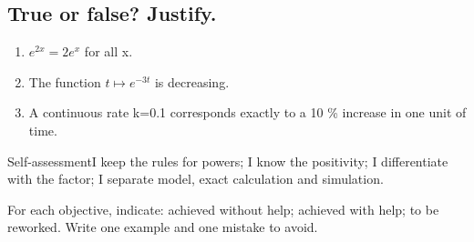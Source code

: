 \subsection*{True or false? Justify.}\label{C09-VF}
\begin{enumerate}
\item $e^{2x}=2e^x$ for all x.
\item The function $t\mapsto e^{-3t}$ is decreasing.
\item A continuous rate k=0.1 corresponds exactly to a 10 \% increase in one unit of time.
\end{enumerate}
\begin{repere}{Self-assessment}I keep the rules for powers; I know the positivity; I differentiate with the factor; I separate model, exact calculation and simulation.

For each objective, indicate: achieved without help; achieved with help; to be reworked. Write one example and one mistake to avoid.\end{repere}
\endgroup
\ifprof\fi
